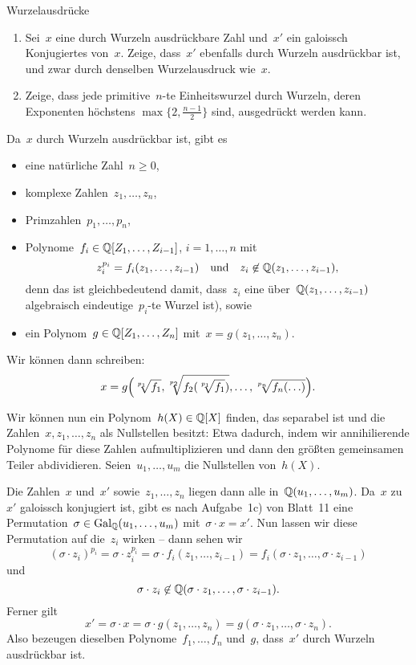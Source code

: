 \documentclass{algblatt}
\begin{document}
\begin{aufgabe}{Wurzelausdrücke}
\begin{enumerate}
\item Sei~$x$ eine durch Wurzeln ausdrückbare Zahl und~$x'$ ein galoissch
Konjugiertes von~$x$. Zeige, dass~$x'$
ebenfalls durch Wurzeln ausdrückbar ist, und zwar durch
denselben Wurzelausdruck wie~$x$.
\item Zeige, dass jede primitive~$n$-te Einheitswurzel durch Wurzeln, deren
Exponenten höchstens $\max\{ 2, \frac{n-1}{2}
\}$ sind, ausgedrückt werden kann.
\end{enumerate}

\begin{loesungE}
\item Da~$x$ durch Wurzeln ausdrückbar ist, gibt es
\begin{itemize}
\item eine natürliche Zahl~$n \geq 0$,
\item komplexe Zahlen~$z_1,\ldots,z_n$,
\item Primzahlen~$p_1,\ldots,p_n$,
\item Polynome~$f_i \in \mathbb{Q}[Z_1,\ldots,Z_{i-1}]$, $i = 1,\ldots,n$ mit
\[ z_i^{p_i} = f_i(z_1,\ldots,z_{i-1}) \quad\text{und}\quad
  z_i \not\in \mathbb{Q}(z_1,\ldots,z_{i-1}), \]
denn das ist gleichbedeutend damit,
dass~$z_i$ eine über~$\mathbb{Q}(z_1,\ldots,z_{i-1})$ algebraisch eindeutige~$p_i$-te
Wurzel ist), sowie
\item ein Polynom~$g \in \mathbb{Q}[Z_1,\ldots,Z_n]$ mit~$x = g(z_1,\ldots,z_n)$.
\end{itemize}
Wir können dann schreiben:
\[ x = g\Bigl(\sqrt[p_1]{f_1}, \sqrt[p_2]{f_2(\sqrt[p_1]{f_1})}, \ldots,
  \sqrt[p_n]{f_n(\ldots)}\Bigr). \]

Wir können nun ein Polynom~$h(X) \in \mathbb{Q}[X]$ finden, das separabel ist und die
Zahlen~$x, z_1, \ldots, z_n$ als Nullstellen besitzt: Etwa dadurch, indem wir
annihilierende Polynome für diese Zahlen aufmultiplizieren und dann den größten
gemeinsamen Teiler abdividieren. Seien~$u_1,\ldots,u_m$ die Nullstellen
von~$h(X)$.

Die Zahlen~$x$ und~$x'$ sowie~$z_1,\ldots,z_n$ liegen dann alle
in~$\mathbb{Q}(u_1,\ldots,u_m)$. Da~$x$ zu~$x'$ galoissch konjugiert ist, gibt es nach
Aufgabe~1c) von Blatt~11 eine Permutation~$\sigma \in \mathrm{Gal}_{\mathbb{Q}}(u_1,\ldots,u_m)$
mit~$\sigma \cdot x = x'$. Nun lassen wir diese Permutation auf die~$z_i$
wirken -- dann sehen wir
\[ (\sigma \cdot z_i)^{p_i} = \sigma \cdot z_i^{p_i} =
  \sigma \cdot f_i(z_1,\ldots,z_{i-1}) =
  f_i(\sigma \cdot z_1,\ldots,\sigma \cdot z_{i-1}) \]
und
\[ \sigma \cdot z_i \not\in \mathbb{Q}(\sigma \cdot z_1,\ldots,\sigma \cdot z_{i-1}).
\]
Ferner gilt
\[ x' = \sigma \cdot x = \sigma \cdot g(z_1,\ldots,z_n) =
  g(\sigma \cdot z_1,\ldots,\sigma \cdot z_n). \]
Also bezeugen dieselben Polynome~$f_1,\ldots,f_n$ und~$g$, dass~$x'$ durch
Wurzeln ausdrückbar ist.


\end{loesungE}
\end{aufgabe}
\end{document}
